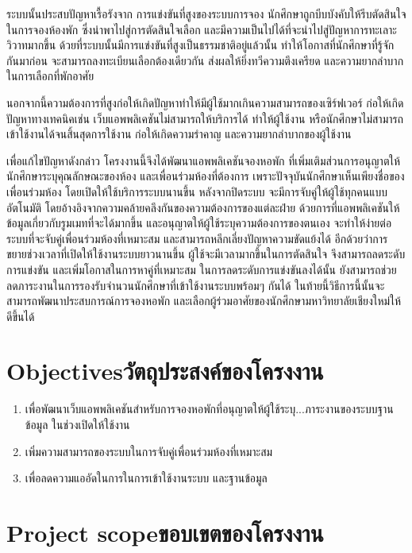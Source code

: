 ระบบนั้นประสบปัญหาเรื้อรังจาก การแข่งขันที่สูงของระบบการจอง นักศึกษาถูกบีบบังคับให้รีบตัดสินใจในการจองห้องพัก
ซึ่งนำพาไปสู่การตัดสินใจเลือก และมีความเป็นไปได้ที่จะนำไปสู่ปัญหาการทะเลาะวิวาทมากขึ้น ด้วยที่ระบบนั้นมีการแข่งขันที่สูงเป็นธรรมชาติอยู่แล้วนั้น
ทำให้โอกาสที่นักศึกษาที่รู้จักกันมาก่อน จะสามารถลงทะเบียนเลือกต้องเดียวกัน ส่งผลให้ยิ่งทวีความตึงเครียด
และความยากลำบากในการเลือกที่พักอาศัย

นอกจากนี้ความต้องการที่สูงก่อให้เกิดปัญหาทำให้มีผู้ใช้มากเกินความสามารถของเซิร์ฟเวอร์ ก่อให้เกิดปัญหาทางเทคนิคเช่น 
เว็บแอพพลิเคชันไม่สามารถให้บริการได้ ทำให้ผู้ใช้งาน หรือนักศึกษาไม่สามารถเข้าใช้งานได้จนสิ้นสุดการใช้งาน 
ก่อให้เกิดความรำคาญ และความยากลำบากของผู้ใช้งาน

เพื่อแก้ไขปัญหาดังกล่าว โครงงานนี้จึงได้พัฒนาแอพพลิเคชันจองหอพัก 
ที่เพิ่มเติมส่วนการอนุญาตให้นักศึกษาระบุคุณลักษณะของห้อง 
และเพื่อนร่วมห้องที่ต้องการ เพราะปัจจุบันนักศึกษาเห็นเพียงชื่อของเพื่อนร่วมห้อง
โดยเปิดให้ใช้บริการระบบนานขึ้น หลังจากปิดระบบ จะมีการจับคู่ให้ผู้ใช้ทุกคนแบบอัตโนมัติ 
โดยอ้างอิงจากความคล้ายคลึงกันของความต้องการของแต่ละฝ่าย
ด้วยการที่แอพพลิเคชันให้ข้อมูลเกี่ยวกับรูมเมทที่จะได้มากขึ้น และอนุญาตให้ผู้ใช้ระบุความต้องการของตนเอง 
จะทำให้ง่ายต่อระบบที่จะจับคู่เพื่อนร่วมห้องที่เหมาะสม และสามารถหลีกเลี่ยงปัญหาความขัดแย้งได้ 
อีกด้วยว่าการขยายช่วงเวลาที่เปิดให้ใช้งานระบบยาวนานขึ้น ผู้ใช้จะมีเวลามากขึ้นในการตัดสินใจ 
จึงสามารถลดระดับการแข่งขัน และเพิ่มโอกาสในการหาคู่ที่เหมาะสม ในการลดระดับการแข่งขันลงได้นั้น 
ยังสามารถช่วยลดภาระงานในการรองรับจำนวนนักศึกษาที่เข้าใช้งานระบบพร้อมๆ กันได้ 
ในท้ายนี้วิธีการนี้นั้นจะสามารถพัฒนาประสบการณ์การจองหอพัก 
และเลือกผู้ร่วมอาศัยของนักศึกษามหาวิทยาลัยเชียงใหม่ให้ดีขึ้นได้

\section{\ifenglish Objectives\else วัตถุประสงค์ของโครงงาน\fi}
\begin{enumerate}
    \item เพื่อพัฒนาเว็บแอพพลิเคชันสำหรับการจองหอพักที่อนุญาตให้ผู้ใช้ระบุ...ภาระงานของระบบฐานข้อมูล ในช่วงเปิดให้ใช้งาน
    \item เพิ่มความสามารถของระบบในการจับคู่เพื่อนร่วมห้องที่เหมาะสม
    \item เพื่อลดความแออัดในการในการเข้าใช้งานระบบ และฐานข้อมูล
\end{enumerate}

\section{\ifenglish Project scope\else ขอบเขตของโครงงาน\fi}
